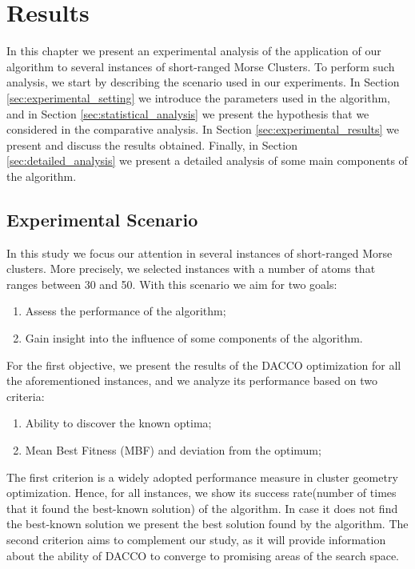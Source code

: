 \chapter{Results}
\label{chap:results}

In this chapter we present an experimental analysis of the application of our algorithm to several instances of short-ranged Morse Clusters. To perform such analysis, we start by describing the scenario used in our experiments. In Section \ref{sec:experimental_setting} we introduce the parameters used in the algorithm, and in Section \ref{sec:statistical_analysis} we present the hypothesis that we considered in the comparative analysis. In Section \ref{sec:experimental_results} we present and discuss the results obtained. Finally, in Section \ref{sec:detailed_analysis} we present a detailed analysis of some main components of the algorithm.




\section{Experimental Scenario}
\label{sec:experimental_scenario}
In this study we focus our attention in several instances of short-ranged Morse clusters. More precisely, we selected instances with a number of atoms that ranges between 30 and 50. With this scenario we aim for two goals: 
	\begin{enumerate}
		\item Assess the performance of the algorithm;
		\item Gain insight into the influence of some components of the algorithm. 
	\end{enumerate}
	
	For the first objective, we present the results of the DACCO optimization for all the aforementioned instances, and we analyze its performance based on two criteria:
	\begin{enumerate}
		\item Ability to discover the known optima;
		\item Mean Best Fitness (MBF) and deviation from the optimum;
	\end{enumerate}
	
	The first criterion is a widely adopted performance measure in cluster geometry optimization. Hence, for all instances, we show its success rate(number of times that it found the best-known solution) of the algorithm. In case it does not find the best-known solution we present the best solution found by the algorithm.
	The second criterion aims to complement our study, as it will provide information about the ability of DACCO to converge to promising areas of the search space.
	
